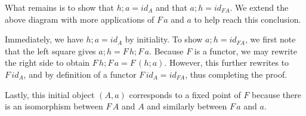 \documentclass{article}
\begin{document}
\begin{enumerate}
\begin{center}
  \end{center}

  \subitem
  What remains is to show that $h;a = id_A$ and that $a; h = id_{FA}$.
  We extend the above diagram with more applications of $F\,a$ and $a$ to help reach this conclusion.

  \begin{center}
  \end{center}
  \subitem 
  Immediately, we have $h;a = id_A$ by initiality.
  To show $a;h = id_{FA}$, we first note that the left square gives $a;h = F\,h;F\,a$.
  Because $F$ is a functor, we may rewrite the right side to obtain $F\,h;F\,a = F\,(h;a)$.
  However, this further rewrites to $F\,id_{A}$, and by definition of a functor $F\,id_A = id_{FA}$, thus completing the proof.

  \subitem 
  Lastly, this initial object $(A,a)$ corresponds to a fixed point of $F$ because there is an isomorphism between $F\,A$ and $A$ and similarly between $F\,a$ and $a$.
  
\end{enumerate}
\end{document}
